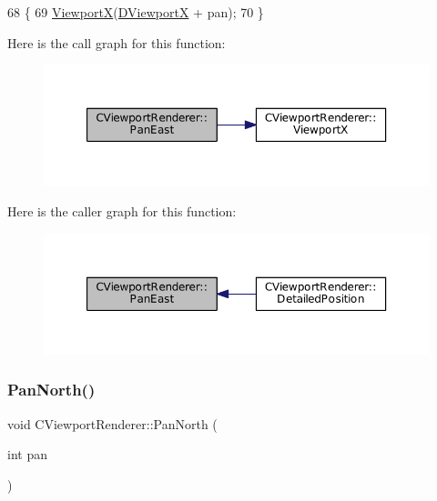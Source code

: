 \begin{DoxyCode}
68                                       \{
69     \hyperlink{classCViewportRenderer_adf6c09ee00cdbf0803e72d59bff9a235}{ViewportX}(\hyperlink{classCViewportRenderer_aea9e05347f71a8e6b83439aab653be18}{DViewportX} + pan);
70 \}
\end{DoxyCode}
Here is the call graph for this function\+:\nopagebreak
\begin{figure}[H]
\begin{center}
\leavevmode
\includegraphics[width=350pt]{classCViewportRenderer_a047d0b83f7744a9d8b184471dae0cd3c_cgraph}
\end{center}
\end{figure}
Here is the caller graph for this function\+:\nopagebreak
\begin{figure}[H]
\begin{center}
\leavevmode
\includegraphics[width=350pt]{classCViewportRenderer_a047d0b83f7744a9d8b184471dae0cd3c_icgraph}
\end{center}
\end{figure}
\hypertarget{classCViewportRenderer_a3dae20056eb4f9fc1c7d8238737ab290}{}\label{classCViewportRenderer_a3dae20056eb4f9fc1c7d8238737ab290} 
\subsubsection{\texorpdfstring{Pan\+North()}{PanNorth()}}
{\footnotesize\ttfamily void C\+Viewport\+Renderer\+::\+Pan\+North (\begin{DoxyParamCaption}\item[{int}]{pan }\end{DoxyParamCaption})}



